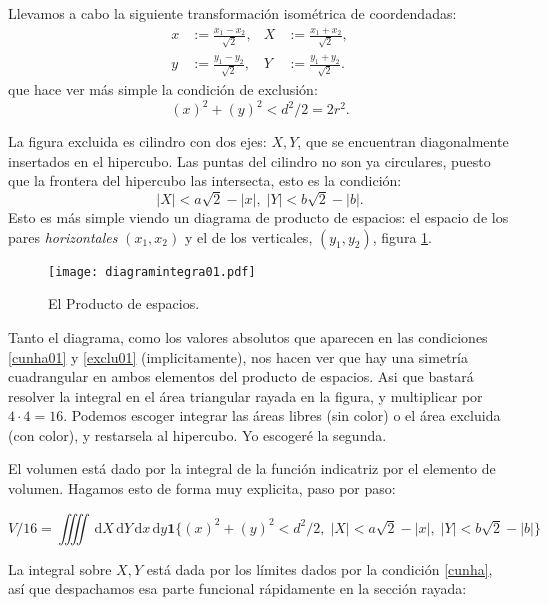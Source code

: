 \documentclass[a4paper,10pt]{article}
\newcommand{\rd}{\, \mathrm{d}}
\newcommand{\Indi}{\mathbf{1}}
\begin{document}
Llevamos a cabo la siguiente transformación isométrica de coordendadas:
\begin{align}
x &:=\frac{x_1-x_2}{\sqrt{2}}, & X &:=\frac{x_1+x_2}{\sqrt{2}}, \\
y &:=\frac{y_1-y_2}{\sqrt{2}}, & Y &:=\frac{y_1+y_2}{\sqrt{2}}.
\end{align}
que hace ver más simple la condición de exclusión:
\begin{equation}\label{exclu01}
(x)^2+(y)^2<d^2/2 = 2r^2.
\end{equation}

La figura excluida es cilindro con dos ejes: $X,Y$, que se encuentran
diagonalmente insertados en el hipercubo. Las puntas del cilindro no
son ya circulares, puesto que la frontera del hipercubo las intersecta, 
esto es la condición:
\begin{equation}\label{cunha01}
|X|<a\sqrt{2}-|x|,\;  |Y|<b\sqrt{2}-|b|.
\end{equation}
Esto es más simple viendo un diagrama de producto de espacios:
el espacio de los pares \emph{horizontales} $(x_1,x_2)$ y el de los
verticales, $(y_1,y_2)$, figura \ref{ProductoEspacios01}.
\begin{figure}[h]
  \centering
  \texttt{[image: diagramintegra01.pdf]}
  \caption{El Producto de espacios.}\label{ProductoEspacios01}
\end{figure}

Tanto el diagrama, como los valores absolutos que aparecen
en las condiciones \ref{cunha01} y \ref{exclu01} (implicitamente),
nos hacen ver que hay una simetría cuadrangular en ambos
elementos del producto de espacios. Asi que bastará resolver
la integral en el área triangular rayada en la figura, y
multiplicar por $4\cdot 4 = 16$. Podemos escoger integrar
las áreas libres (sin color) o el área excluida (con color), y restarsela al 
hipercubo. Yo escogeré la segunda. 

El volumen está dado por la integral de la función indicatriz por el 
elemento de volumen. Hagamos esto de forma muy explicita, paso por paso:

\begin{equation}
V/16 =\iiiint \rd X \rd Y \rd x \rd y 
\Indi \{(x)^2+(y)^2<d^2/2,\; |X|<a\sqrt{2}-|x|,\;  |Y|<b\sqrt{2}-|b|\}
\end{equation}

La integral sobre $X,Y$ está dada por los límites dados por la condición
\ref{cunha}, así que despachamos esa parte funcional rápidamente en la sección rayada:
\end{document}
